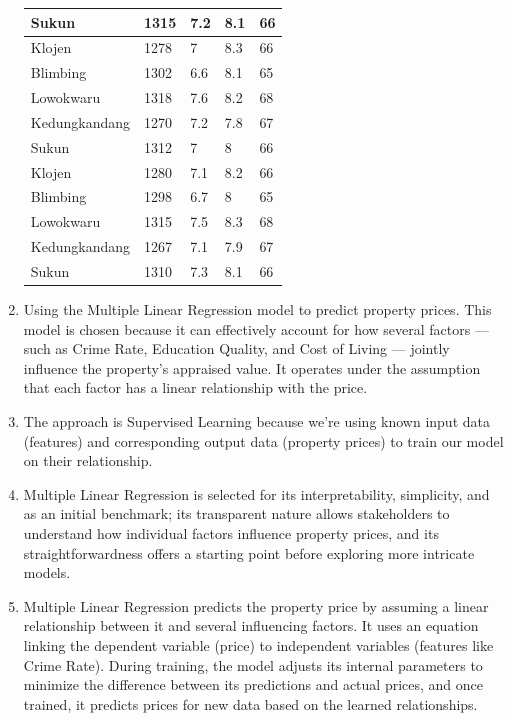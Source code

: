 \documentclass[12pt,titlepage]{article}
\begin{document}
\begin{enumerate}
{\begin{tabular}{|l|l|l|l|l|}
            \hline
            Sukun           &   1315    &   7.2 &   8.1 &   66\\
            \hline
            Klojen          &   1278    &   7   &   8.3 &   66\\
            \hline
            Blimbing        &   1302    &   6.6 &   8.1 &   65\\
            \hline
            Lowokwaru       &   1318    &   7.6 &   8.2 &   68\\
            \hline
            Kedungkandang   &   1270    &   7.2 &   7.8 &   67\\
            \hline
            Sukun           &   1312    &   7   &   8   &   66\\
            \hline
            Klojen          &   1280    &   7.1 &   8.2 &   66\\
            \hline
            Blimbing        &   1298    &   6.7 &   8   &   65\\
            \hline
            Lowokwaru       &   1315    &   7.5 &   8.3 &   68\\
            \hline
            Kedungkandang   &   1267    &   7.1 &   7.9 &   67\\
            \hline
            Sukun           &   1310    &   7.3 &   8.1 &   66\\
            \hline
        \end{tabular}
    }
    \newpage
    \item Using the Multiple Linear Regression model to predict property prices. This model is chosen because it can effectively account for how several factors — such as Crime Rate, Education Quality, and Cost of Living — jointly influence the property's appraised value. It operates under the assumption that each factor has a linear relationship with the price.
    \item The approach is Supervised Learning because we're using known input data (features) and corresponding output data (property prices) to train our model on their relationship.
    \item Multiple Linear Regression is selected for its interpretability, simplicity, and as an initial benchmark; its transparent nature allows stakeholders to understand how individual factors influence property prices, and its straightforwardness offers a starting point before exploring more intricate models.
    \item Multiple Linear Regression predicts the property price by assuming a linear relationship between it and several influencing factors. It uses an equation linking the dependent variable (price) to independent variables (features like Crime Rate). During training, the model adjusts its internal parameters to minimize the difference between its predictions and actual prices, and once trained, it predicts prices for new data based on the learned relationships.
\end{enumerate}
\end{document}
